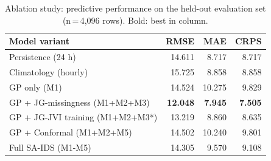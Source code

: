 \begin{table}[ht]
\centering
\caption{Ablation study: predictive performance on the held-out evaluation set
         (n\,=\,4{,}096 rows). Bold: best in column.}
\label{tab:ablation}
\begin{tabular}{lrrr}
\toprule
Model variant & RMSE & MAE & CRPS \\
\midrule
Persistence (24 h) & 14.611 & 8.717 & 8.717 \\
Climatology (hourly) & 15.725 & 8.858 & 8.858 \\
\midrule

GP only (M1) & 14.524 & 10.275 & 9.829 \\
GP + JG-missingness (M1+M2+M3) & \textbf{12.048} & \textbf{7.945} & \textbf{7.505} \\
GP + JG-JVI training (M1+M2+M3*) & 13.219 & 8.860 & 8.635 \\
GP + Conformal (M1+M2+M5) & 14.502 & 10.240 & 9.801 \\
Full SA-IDS (M1-M5) & 14.305 & 9.570 & 9.108 \\
\bottomrule
\end{tabular}
\end{table}
